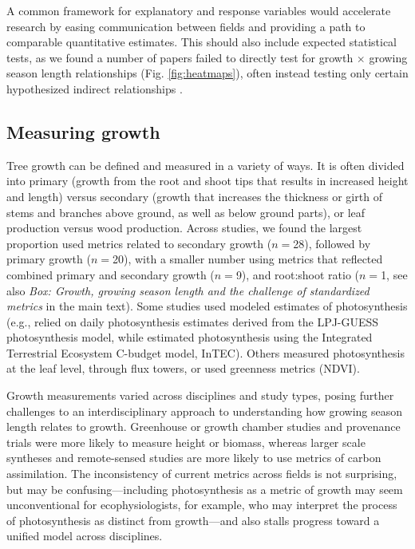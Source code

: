 \documentclass[11pt]{article}
\begin{document}
A common framework for explanatory and response variables would accelerate research by easing communication between fields and providing a path to comparable quantitative estimates. 
This should also include expected statistical tests, as we found a number of papers failed to directly test for growth $\times$ growing season length relationships (Fig. \ref{fig:heatmaps}), often instead testing only certain hypothesized indirect relationships \citep[e.g. spring temperature $\times$ growth in][]{dow2022warm}. %

\subsection*{Measuring growth}

Tree growth can be defined and measured in a variety of ways. It is often divided into primary (growth from the root and shoot tips that results in increased height and length) versus secondary (growth that increases the thickness or girth of stems and branches above ground, as well as below ground parts), or leaf production versus wood production. Across studies, we found the largest proportion used metrics related to secondary growth ($n=$28), followed by primary growth ($n=$20), with a smaller number using metrics that reflected combined primary and secondary growth ($n=$9), and root:shoot ratio ($n=$1, see also \emph{Box: Growth, growing season length and the challenge of standardized metrics} in the main text).  Some studies used modeled estimates of photosynthesis (e.g., \citet{smith2014implications} relied on daily photosynthesis estimates derived from the LPJ-GUESS photosynthesis model, while \citet{chen2000approaches} estimated photosynthesis using the Integrated Terrestrial Ecosystem C-budget model, InTEC). 
Others measured photosynthesis at the leaf level, through flux towers, or used greenness metrics (NDVI). 

Growth measurements varied across disciplines and study types, posing further challenges to an interdisciplinary approach to understanding how growing season length relates to growth. 
Greenhouse or growth chamber studies and provenance trials were more likely to measure height or biomass, whereas larger scale syntheses and remote-sensed studies are more likely to use metrics of carbon assimilation. 
The inconsistency of current metrics across fields is not surprising, but may be confusing---including photosynthesis as a metric of growth may seem unconventional for ecophysiologists, for example, who may interpret the process of photosynthesis as distinct from growth---and also stalls progress toward a unified model across disciplines.
\end{document}
